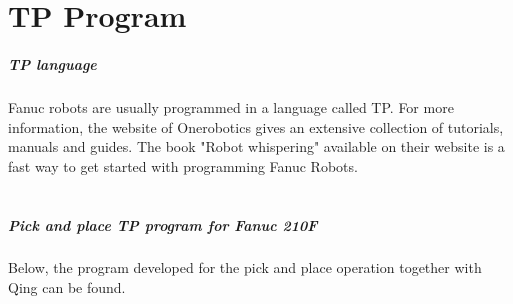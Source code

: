 \chapter{TP Program} \label{TPprogram210F}

\paragraph{TP language}Fanuc robots are usually programmed in a language called TP. For more information, the website of Onerobotics \cite{OneRobotics} gives an extensive collection of tutorials, manuals and guides. The book "Robot whispering" \cite{RobotWhispering} available on their website is a fast way to get started with programming Fanuc Robots.\\
\\
\paragraph{Pick and place TP program for Fanuc 210F}
Below, the program developed for the pick and place operation together with Qing can be found.

